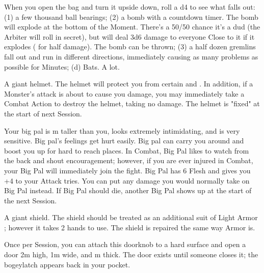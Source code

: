 \begin{multicols*}{2}\raggedcolumns


When you open the bag and turn it upside down, roll a d4 to see what falls out:  (1) a few thousand ball bearings; (2) a bomb with a countdown timer.  The bomb will explode at the bottom of the  Moment.  There's a 50/50 chance it's a dud (the Arbiter will roll in secret), but will deal 3d6 damage to everyone Close to it if it explodes ( for half damage).  The bomb can be thrown;  (3) a half dozen gremlins fall out and run in different directions, immediately causing as many problems as possible for Minutes; (d)  Bats. A lot.



A giant helmet.  The helmet will protect you from certain  and .  In addition, if a Monster's attack is about to cause you  damage, you may immediately take a Combat Action to destroy the helmet, taking no damage.  The helmet is "fixed" at the start of next Session.



Your big pal is \OneHalf m taller than you, looks extremely intimidating, and is very sensitive.  Big pal's feelings get hurt easily.  Big pal can carry you around and boost you up for hard to reach places.  In Combat, Big Pal likes to watch from the back and shout encouragement; however, if you are ever injured in Combat, your Big Pal will immediately join the fight.  Big Pal has 6 Flesh and gives you +4 to your Attack \RO tries.  You can put any damage you would normally take on Big Pal instead.  If Big Pal should die, another Big Pal shows up at the start of the next Session.




A giant shield.  The shield should be treated as an additional suit of Light Armor ; however it takes 2 hands to use.  The shield is repaired the same way Armor is.


Once per Session, you can attach this doorknob to a hard surface and open a door 2m high, 1m wide, and \OneHalf m thick.  The door exists until someone closes it; the bogeylatch appears back in your pocket.



\end{multicols*}
